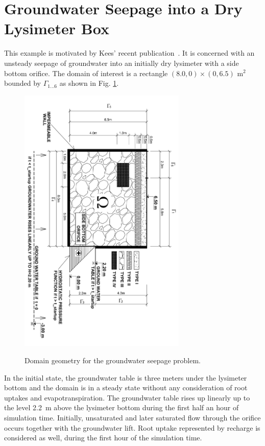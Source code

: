 \documentclass[final,3p,times,twocolumn]{elsarticle}
\begin{document}
\section{Groundwater Seepage into a Dry Lysimeter Box}
\label{sec:example}

This example is motivated by Kees' recent publication~\cite{kees}.  It is
concerned with an unsteady seepage of groundwater into an initially dry lysimeter with 
a side bottom orifice. The domain of interest is a rectangle $(8.0, 0)  \times (0, 6.5)$ m$^2$ 
bounded by $\Gamma_{1...6}$ as shown in Fig. \ref{fig:kees-uloha}.

\begin{figure}[!ht]
\begin{center}
 {
\includegraphics[width=8cm]{kees-uloha.png}
}
\end{center}
\vspace{-6mm}
\caption{Domain geometry for the groundwater seepage problem.}
\label{fig:kees-uloha}
\end{figure}

In the initial state, the groundwater table is three meters under 
the lysimeter bottom and the domain is in a steady state without any consideration of root 
uptakes and evapotranspiration. The groundwater table rises up linearly up to the level 
2.2~m above the lysimeter bottom during the first half an hour of simulation time. 
Initially, unsaturated and later saturated flow through the orifice occurs together with 
the groundwater lift. Root uptake represented by recharge is considered as well, during 
the first hour of the simulation time. 
\end{document}
